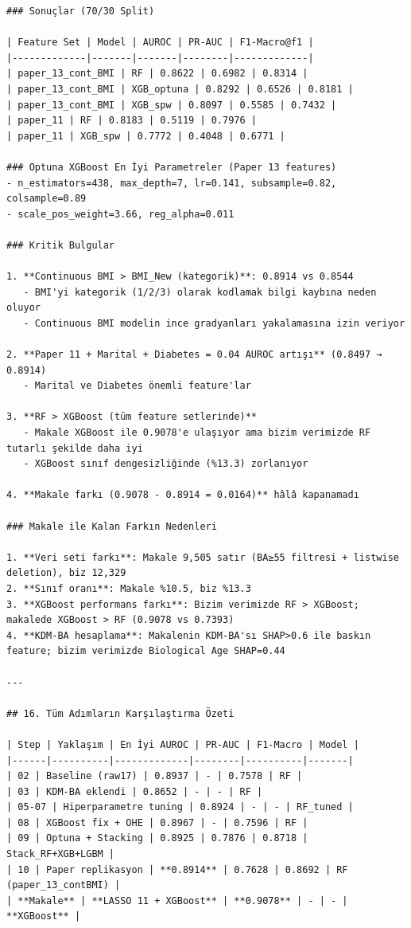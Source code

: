 ﻿\documentclass[11pt,a4paper]{article}
\begin{document}
\begin{verbatim}
### Sonuçlar (70/30 Split)

| Feature Set | Model | AUROC | PR-AUC | F1-Macro@f1 |
|-------------|-------|-------|--------|-------------|
| paper_13_cont_BMI | RF | 0.8622 | 0.6982 | 0.8314 |
| paper_13_cont_BMI | XGB_optuna | 0.8292 | 0.6526 | 0.8181 |
| paper_13_cont_BMI | XGB_spw | 0.8097 | 0.5585 | 0.7432 |
| paper_11 | RF | 0.8183 | 0.5119 | 0.7976 |
| paper_11 | XGB_spw | 0.7772 | 0.4048 | 0.6771 |

### Optuna XGBoost En İyi Parametreler (Paper 13 features)
- n_estimators=438, max_depth=7, lr=0.141, subsample=0.82, colsample=0.89
- scale_pos_weight=3.66, reg_alpha=0.011

### Kritik Bulgular

1. **Continuous BMI > BMI_New (kategorik)**: 0.8914 vs 0.8544
   - BMI'yi kategorik (1/2/3) olarak kodlamak bilgi kaybına neden oluyor
   - Continuous BMI modelin ince gradyanları yakalamasına izin veriyor

2. **Paper 11 + Marital + Diabetes = 0.04 AUROC artışı** (0.8497 → 0.8914)
   - Marital ve Diabetes önemli feature'lar

3. **RF > XGBoost (tüm feature setlerinde)**
   - Makale XGBoost ile 0.9078'e ulaşıyor ama bizim verimizde RF tutarlı şekilde daha iyi
   - XGBoost sınıf dengesizliğinde (%13.3) zorlanıyor

4. **Makale farkı (0.9078 - 0.8914 = 0.0164)** hâlâ kapanamadı

### Makale ile Kalan Farkın Nedenleri

1. **Veri seti farkı**: Makale 9,505 satır (BA≥55 filtresi + listwise deletion), biz 12,329
2. **Sınıf oranı**: Makale %10.5, biz %13.3
3. **XGBoost performans farkı**: Bizim verimizde RF > XGBoost; makalede XGBoost > RF (0.9078 vs 0.7393)
4. **KDM-BA hesaplama**: Makalenin KDM-BA'sı SHAP>0.6 ile baskın feature; bizim verimizde Biological Age SHAP=0.44

---

## 16. Tüm Adımların Karşılaştırma Özeti

| Step | Yaklaşım | En İyi AUROC | PR-AUC | F1-Macro | Model |
|------|----------|-------------|--------|----------|-------|
| 02 | Baseline (raw17) | 0.8937 | - | 0.7578 | RF |
| 03 | KDM-BA eklendi | 0.8652 | - | - | RF |
| 05-07 | Hiperparametre tuning | 0.8924 | - | - | RF_tuned |
| 08 | XGBoost fix + OHE | 0.8967 | - | 0.7596 | RF |
| 09 | Optuna + Stacking | 0.8925 | 0.7876 | 0.8718 | Stack_RF+XGB+LGBM |
| 10 | Paper replikasyon | **0.8914** | 0.7628 | 0.8692 | RF (paper_13_contBMI) |
| **Makale** | **LASSO 11 + XGBoost** | **0.9078** | - | - | **XGBoost** |


\end{verbatim}
\end{document}
